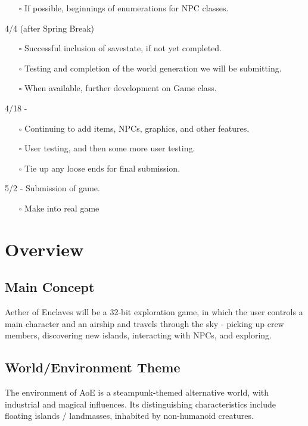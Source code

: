 \documentclass[a4paper]{scrreprt}
\begin{document}
\begin{enumerate}
\begin{itemize}
   \item[$\square$] If possible, beginnings of enumerations for NPC classes.
   \end{itemize}
   4/4 (after Spring Break)
   \begin{itemize}
   \item[$\square$] Successful inclusion of savestate, if not yet completed.
   \item[$\square$] Testing and completion of the world generation we will be submitting.
   \item[$\square$] When available, further development on Game class.
   \end{itemize}
   4/18 - \begin{itemize}
   \item[$\square$] Continuing to add items, NPCs, graphics, and other features.
   \item[$\square$] User testing, and then some more user testing.
   \item[$\square$] Tie up any loose ends for final submission.
   \end{itemize}
   5/2 - Submission of game.
   \begin{itemize}
   \item[$\square$] Make into real game
   \end{itemize}
 \end{enumerate}





\chapter{Overview}

\section{Main Concept}
Aether of Enclaves will be a 32-bit exploration game, in which the user controls a main character and an airship and travels through the sky - picking up crew members, discovering new islands, interacting with NPCs, and exploring.

\section{World/Environment Theme}
The environment of AoE is a steampunk-themed alternative world, with industrial and magical influences. Its distinguishing characteristics include floating islands / landmasses, inhabited by non-humanoid creatures.
\end{document}
